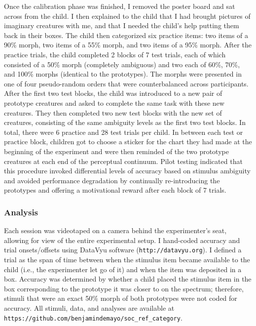 \documentclass[floatsintext,man]{apa6}
\theoremstyle{definition}
\theoremstyle{definition}
\theoremstyle{definition}
\theoremstyle{remark}
\begin{document}
Once the calibration phase was finished, I removed the poster board and
sat across from the child. I then explained to the child that I had
brought pictures of imaginary creatures with me, and that I needed the
child's help putting them back in their boxes. The child then
categorized six practice items: two items of a 90\% morph, two items of
a 55\% morph, and two items of a 95\% morph. After the practice trials,
the child completed 2 blocks of 7 test trials, each of which consisted
of a 50\% morph (completely ambiguous) and two each of 60\%, 70\%, and
100\% morphs (identical to the prototypes). The morphs were presented in
one of four pseudo-random orders that were counterbalanced across
participants. After the first two test blocks, the child was introduced
to a new pair of prototype creatures and asked to complete the same task
with these new creatures. They then completed two new test blocks with
the new set of creatures, consisting of the same ambiguity levels as the
first two test blocks. In total, there were 6 practice and 28 test
trials per child. In between each test or practice block, children got
to choose a sticker for the chart they had made at the beginning of the
experiment and were then reminded of the two prototype creatures at each
end of the perceptual continuum. Pilot testing indicated that this
procedure invoked differential levels of accuracy based on stimulus
ambiguity and avoided performance degradation by continually
re-introducing the prototypes and offering a motivational reward after
each block of 7 trials.

\subsubsection{Analysis}\label{analysis}

Each session was videotaped on a camera behind the experimenter's seat,
allowing for view of the entire experimental setup. I hand-coded
accuracy and trial onsets/offsets using DataVyu software
(\texttt{http://datavyu.org}). I defined a trial as the span of time
between when the stimulus item became available to the child (i.e., the
experimenter let go of it) and when the item was deposited in a box.
Accuracy was determined by whether a child placed the stimulus item in
the box corresponding to the prototype it was closer to on the spectrum;
therefore, stimuli that were an exact 50\% morph of both prototypes were
not coded for accuracy. All stimuli, data, and analyses are available at
\texttt{https://github.com/benjamindemayo/soc\_ref\_category}.
\end{document}
